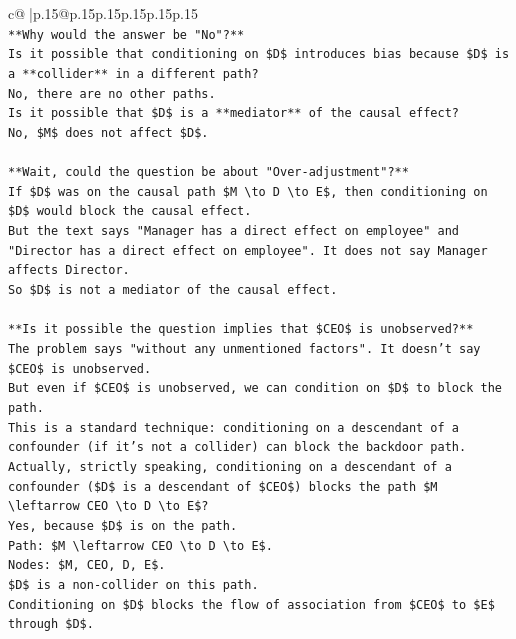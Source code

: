 \documentclass{article}
\begin{document}
{\begin{supertabular}{c@{$\;$}|p{.15\linewidth}@{}p{.15\linewidth}p{.15\linewidth}p{.15\linewidth}p{.15\linewidth}p{.15\linewidth}}
{{{\\ 
\texttt{**Why would the answer be "No"?**} \\
\texttt{Is it possible that conditioning on \$D\$ introduces bias because \$D\$ is a **collider** in a different path?} \\
\texttt{No, there are no other paths.} \\
\texttt{Is it possible that \$D\$ is a **mediator** of the causal effect?} \\
\texttt{No, \$M\$ does not affect \$D\$.} \\
\\ 
\texttt{**Wait, could the question be about "Over{-}adjustment"?**} \\
\texttt{If \$D\$ was on the causal path \$M \textbackslash{}to D \textbackslash{}to E\$, then conditioning on \$D\$ would block the causal effect.} \\
\texttt{But the text says "Manager has a direct effect on employee" and "Director has a direct effect on employee". It does not say Manager affects Director.} \\
\texttt{So \$D\$ is not a mediator of the causal effect.} \\
\\ 
\texttt{**Is it possible the question implies that \$CEO\$ is unobserved?**} \\
\texttt{The problem says "without any unmentioned factors". It doesn't say \$CEO\$ is unobserved.} \\
\texttt{But even if \$CEO\$ is unobserved, we can condition on \$D\$ to block the path.} \\
\texttt{This is a standard technique: conditioning on a descendant of a confounder (if it's not a collider) can block the backdoor path.} \\
\texttt{Actually, strictly speaking, conditioning on a descendant of a confounder (\$D\$ is a descendant of \$CEO\$) blocks the path \$M \textbackslash{}leftarrow CEO \textbackslash{}to D \textbackslash{}to E\$?} \\
\texttt{Yes, because \$D\$ is on the path.} \\
\texttt{Path: \$M \textbackslash{}leftarrow CEO \textbackslash{}to D \textbackslash{}to E\$.} \\
\texttt{Nodes: \$M, CEO, D, E\$.} \\
\texttt{\$D\$ is a non{-}collider on this path.} \\
\texttt{Conditioning on \$D\$ blocks the flow of association from \$CEO\$ to \$E\$ through \$D\$.} \\
}}}
\end{supertabular}}
\end{document}
